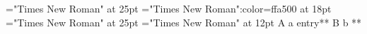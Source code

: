 \font\entryletHeaddiv="Times New Roman" at 25pt
\font{}="Times New Roman":color=ffa500 at 18pt
\font{}="Times New Roman" at 25pt
\font\div="Times New Roman" at 12pt
 A a
\entryletHeaddiv entry**
 B b
**


\bye
